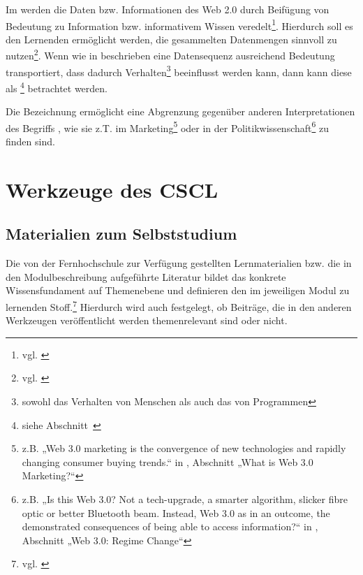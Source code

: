 Im  werden die Daten bzw. Informationen des Web 2.0 durch Beifügung von Bedeutung zu Information bzw. informativem Wissen veredelt\footnote{vgl. \cite{nyt:markoff}}. Hierdurch soll es den Lernenden ermöglicht werden, die gesammelten Datenmengen sinnvoll zu nutzen\footnote{vgl. \cite{tsp:tolksdorf}}. Wenn wie in \cite{sagaran} beschrieben eine Datensequenz ausreichend Bedeutung transportiert, dass dadurch Verhalten\footnote{sowohl das Verhalten von Menschen als auch das von Programmen} beeinflusst werden kann, dann kann diese als \footnote{siehe Abschnitt~} betrachtet werden.

Die Bezeichnung  ermöglicht eine Abgrenzung gegenüber anderen Interpretationen des Begriffs , wie sie z.T. im Marketing\footnote{z.B. „Web 3.0 marketing is the convergence of new technologies and rapidly changing consumer buying trends.“ in \cite{web3market}, Abschnitt „What is Web 3.0 Marketing?“} oder in der Politikwissenschaft\footnote{z.B. „Is this Web 3.0? Not a tech-upgrade, a smarter algorithm, slicker fibre optic or better Bluetooth beam. Instead, Web 3.0 as in an outcome, the demonstrated consequences of being able to access information?“ in \cite{web3pol}, Abschnitt „Web 3.0: Regime Change“} zu finden sind.


\section{Werkzeuge des CSCL} %
\label{sec:werkzeuge_des_cscl}

\subsection{Materialien zum Selbststudium} %
\label{sub:materialien_zum_selbststudium}
Die von der Fernhochschule zur Verfügung gestellten Lernmaterialien bzw. die in den Modulbeschreibung aufgeführte Literatur bildet das konkrete Wissensfundament auf Themenebene und definieren den im jeweiligen Modul zu lernenden Stoff.\footnote{vgl. \cite{pnikmail}} Hierdurch wird auch festgelegt, ob Beiträge, die in den anderen Werkzeugen veröffentlicht werden themenrelevant sind oder nicht.

